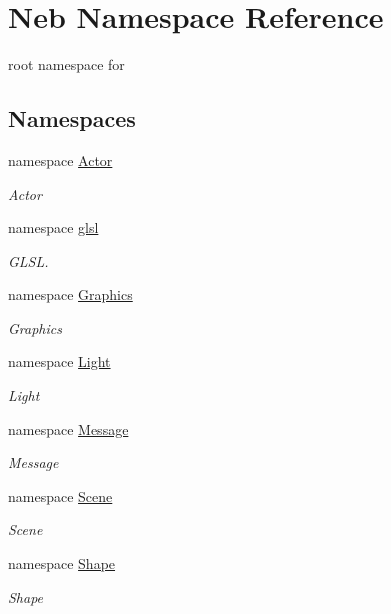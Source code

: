 \hypertarget{namespaceNeb}{\section{\-Neb \-Namespace \-Reference}
\label{namespaceNeb}
}


root namespace for   


\subsection*{\-Namespaces}
\begin{DoxyCompactItemize}
\item 
namespace \hyperlink{namespaceNeb_1_1Actor}{\-Actor}
\begin{DoxyCompactList}\small\item\em \-Actor \end{DoxyCompactList}\item 
namespace \hyperlink{namespaceNeb_1_1glsl}{glsl}
\begin{DoxyCompactList}\small\item\em \-G\-L\-S\-L. \end{DoxyCompactList}\item 
namespace \hyperlink{namespaceNeb_1_1Graphics}{\-Graphics}
\begin{DoxyCompactList}\small\item\em \-Graphics \end{DoxyCompactList}\item 
namespace \hyperlink{namespaceNeb_1_1Light}{\-Light}
\begin{DoxyCompactList}\small\item\em \-Light \end{DoxyCompactList}\item 
namespace \hyperlink{namespaceNeb_1_1Message}{\-Message}
\begin{DoxyCompactList}\small\item\em \-Message \end{DoxyCompactList}\item 
namespace \hyperlink{namespaceNeb_1_1Scene}{\-Scene}
\begin{DoxyCompactList}\small\item\em \-Scene \end{DoxyCompactList}\item 
namespace \hyperlink{namespaceNeb_1_1Shape}{\-Shape}
\begin{DoxyCompactList}\small\item\em \-Shape \end{DoxyCompactList}\end{DoxyCompactItemize}

